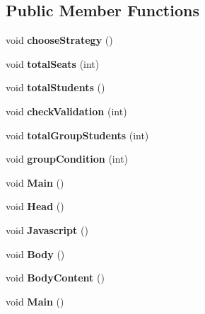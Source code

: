 \subsection*{Public Member Functions}
\begin{DoxyCompactItemize}
\item 
\hypertarget{classStrategy_a1a81ab4bb7e44d8bd9a96ddc1d7c2be8}{void {\bfseries choose\-Strategy} ()}\label{classStrategy_a1a81ab4bb7e44d8bd9a96ddc1d7c2be8}

\item 
\hypertarget{classStrategy_abbeb9baaf7af96813941d17b21ff0045}{void {\bfseries total\-Seats} (int)}\label{classStrategy_abbeb9baaf7af96813941d17b21ff0045}

\item 
\hypertarget{classStrategy_a4303160d0492974f8f92f659085586e4}{void {\bfseries total\-Students} ()}\label{classStrategy_a4303160d0492974f8f92f659085586e4}

\item 
\hypertarget{classStrategy_a6849a678a8198d0b3c1837a49ce3fc3e}{void {\bfseries check\-Validation} (int)}\label{classStrategy_a6849a678a8198d0b3c1837a49ce3fc3e}

\item 
\hypertarget{classStrategy_ac2dd78118c6bd786e8b2bd1e37237202}{void {\bfseries total\-Group\-Students} (int)}\label{classStrategy_ac2dd78118c6bd786e8b2bd1e37237202}

\item 
\hypertarget{classStrategy_a67f419e227903badcacffde2dd725761}{void {\bfseries group\-Condition} (int)}\label{classStrategy_a67f419e227903badcacffde2dd725761}

\item 
\hypertarget{classStrategy_a795aec6d20e2f2d94c0a0c42f62d9c84}{void {\bfseries Main} ()}\label{classStrategy_a795aec6d20e2f2d94c0a0c42f62d9c84}

\item 
\hypertarget{classStrategy_a0cb8eed51ebbe2525db7f38be7e7029b}{void {\bfseries Head} ()}\label{classStrategy_a0cb8eed51ebbe2525db7f38be7e7029b}

\item 
\hypertarget{classStrategy_ad2f8797a27e6d992a029659fcc2fa42c}{void {\bfseries Javascript} ()}\label{classStrategy_ad2f8797a27e6d992a029659fcc2fa42c}

\item 
\hypertarget{classStrategy_af06057d962f931b5607a6fb1f0dbb3f5}{void {\bfseries Body} ()}\label{classStrategy_af06057d962f931b5607a6fb1f0dbb3f5}

\item 
\hypertarget{classStrategy_a8af7b8bc100001ccdc945c04844bc3ee}{void {\bfseries Body\-Content} ()}\label{classStrategy_a8af7b8bc100001ccdc945c04844bc3ee}

\item 
\hypertarget{classStrategy_a795aec6d20e2f2d94c0a0c42f62d9c84}{void {\bfseries Main} ()}\label{classStrategy_a795aec6d20e2f2d94c0a0c42f62d9c84}

\end{DoxyCompactItemize}
